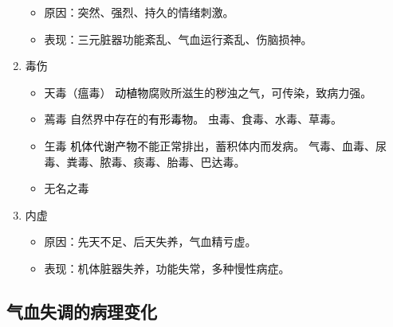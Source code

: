 \documentclass[cn,black,12pt,normal,founder]{elegantnote}
\newcommand{\redt}[1]{\textcolor{black}{{}#1}}      %
\begin{document}
\begin{enumerate}
  \begin{itemize}
    \item 原因：突然、强烈、持久的情绪刺激。
    \item 表现：三元脏器功能紊乱、气血运行紊乱、伤脑损神。
  \end{itemize}

  \item 毒伤

  \begin{itemize}
    \item 天毒（瘟毒）
    \subitem \redt{动植物}腐败所滋生的秽浊之气，可传染，致病力强。
    \item 蔫毒
    \subitem 自然界中存在的\redt{有形毒物}。
    \subitem 虫毒、食毒、水毒、草毒。
    \item 玍毒
    \subitem \redt{机体代谢产物}不能正常排出，蓄积体内而发病。
    \subitem 气毒、血毒、尿毒、粪毒、脓毒、痰毒、胎毒、巴达毒。
    \item 无名之毒
  \end{itemize}

  \item 内虚

  \begin{itemize}
    \item 原因：先天不足、后天失养，气血精亏虚。
    \item 表现：机体脏器失养，功能失常，多种慢性病症。
  \end{itemize}
\end{enumerate}

\subsection{气血失调的病理变化}
\end{document}
